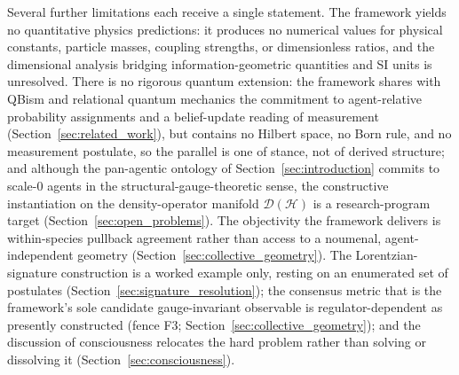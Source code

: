 \documentclass[11pt]{article}
\begin{document}
Several further limitations each receive a single statement. The framework yields no quantitative physics predictions: it produces no numerical values for physical constants, particle masses, coupling strengths, or dimensionless ratios, and the dimensional analysis bridging information-geometric quantities and SI units is unresolved. There is no rigorous quantum extension: the framework shares with QBism and relational quantum mechanics the commitment to agent-relative probability assignments and a belief-update reading of measurement (Section~\ref{sec:related_work}), but contains no Hilbert space, no Born rule, and no measurement postulate, so the parallel is one of stance, not of derived structure; and although the pan-agentic ontology of Section~\ref{sec:introduction} commits to scale-0 agents in the structural-gauge-theoretic sense, the constructive instantiation on the density-operator manifold $\mathcal{D}(\mathcal{H})$ is a research-program target (Section~\ref{sec:open_problems}). The objectivity the framework delivers is within-species pullback agreement rather than access to a noumenal, agent-independent geometry (Section~\ref{sec:collective_geometry}). The Lorentzian-signature construction is a worked example only, resting on an enumerated set of postulates (Section~\ref{sec:signature_resolution}); the consensus metric that is the framework's sole candidate gauge-invariant observable is regulator-dependent as presently constructed (fence F3; Section~\ref{sec:collective_geometry}); and the discussion of consciousness relocates the hard problem rather than solving or dissolving it (Section~\ref{sec:consciousness}).
\end{document}
